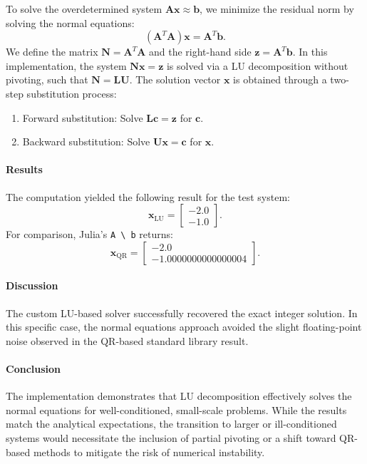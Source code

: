 \begin{solution}

	To solve the overdetermined system $\mathbf{A}\mathbf{x} \approx
		\mathbf{b}$, we minimize the residual norm by solving the normal equations:
	\[
		(\mathbf{A}^T \mathbf{A}) \mathbf{x} = \mathbf{A}^T \mathbf{b}.
	\]
	We define the matrix $\mathbf{N} = \mathbf{A}^T \mathbf{A}$ and the
	right-hand side $\mathbf{z} = \mathbf{A}^T \mathbf{b}$. In this implementation,
	the system $\mathbf{N}\mathbf{x} = \mathbf{z}$ is solved via a LU decomposition
	without pivoting, such that $\mathbf{N} = \mathbf{L}\mathbf{U}$. The solution
	vector $\mathbf{x}$ is obtained through a two-step substitution process:
	\begin{enumerate}
		\item Forward substitution: Solve $\mathbf{L}\mathbf{c} = \mathbf{z}$ for $\mathbf{c}$.
		\item Backward substitution: Solve $\mathbf{U}\mathbf{x} = \mathbf{c}$ for $\mathbf{x}$.
	\end{enumerate}

	\paragraph{Results}
	The computation yielded the following result for the test system:
	\[
		\mathbf{x}_{\text{LU}} = \begin{bmatrix} -2.0 \\ -1.0 \end{bmatrix}.
	\]
	For comparison, Julia's \texttt{A \textbackslash{} b} returns:
	\[
		\mathbf{x}_{\text{QR}} = \begin{bmatrix}
			-2.0 \\
			-1.0000000000000004
		\end{bmatrix}.
	\]

	\paragraph{Discussion}
	The custom LU-based solver successfully recovered the exact integer solution.
	In this specific case, the normal equations approach avoided the slight
	floating-point noise observed in the QR-based standard library result.

	\paragraph{Conclusion}
	The implementation demonstrates that LU decomposition effectively solves the
	normal equations for well-conditioned, small-scale problems. While the results
	match the analytical expectations, the transition to larger or ill-conditioned
	systems would necessitate the inclusion of partial pivoting or a shift toward
	QR-based methods to mitigate the risk of numerical instability.

\end{solution}

